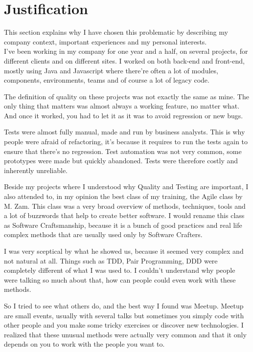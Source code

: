 \section{Justification}\label{sec:justification}
This section explains why I have chosen this problematic by describing
my company context, important experiences and my personal interests. \\
I've been working in my company for one year and a half, on several
projects, for different clients and on different sites.
I worked on both back-end and front-end, mostly using Java and Javascript where
there're often a lot of modules, components, environments, teams and of course
a lot of legacy code.

The definition of quality on these projects was not exactly the same as mine.
The only thing that matters was almost always a working feature, no matter
what.
And once it worked, you had to let it as it was to avoid regression or new
bugs.

Tests were almost fully manual, made and run by business analysts.
This is why people were afraid of refactoring, it's because it requires to
run the tests again to ensure that there's no regression.
Test automation was not very common, some prototypes were made but quickly
abandoned.
Tests were therefore costly and inherently unreliable.

Beside my projects where I understood why Quality and Testing are
important, I also attended to, in my opinion the best class of my
training, the Agile class by M. Zam.
This class was a very broad overview of methods, techniques, tools and a
lot of buzzwords that help to create better software.
I would rename this class as Software Craftsmanship, because it is a
bunch of good practices and real life complex methods that are usually
used only by Software Crafters.

I was very sceptical by what he showed us, because it seemed very complex
and not natural at all.
Things such as TDD, Pair Programming, DDD were completely different of
what I was used to.
I couldn't understand why people were talking so much about that, how can
people could even work with these methods.

So I tried to see what others do, and the best way I found was Meetup.
Meetup are small events, usually with several talks but sometimes you
simply code with other people and you make some tricky exercises or
discover new technologies.
I realized that these unusual methods were actually very common and that
it only depends on you to work with the people you want to.

